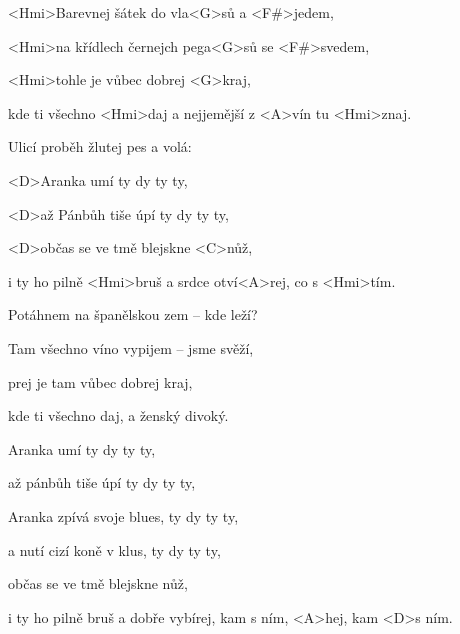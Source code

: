 

\zs
<Hmi>Barevnej šátek do vla<G>sů a <F#>jedem,

<Hmi>na křídlech černejch pega<G>sů se <F#>svedem,

<Hmi>tohle je vůbec dobrej <G>kraj,

kde ti všechno <Hmi>daj a nejjemější z <A>vín tu <Hmi>znaj.
\ks

\zs
Ulicí proběh žlutej pes a volá:

\ks

\zr
<D>Aranka umí  ty dy ty ty,

<D>až Pánbůh tiše úpí  ty dy ty ty,

<D>občas se ve tmě blejskne <C>nůž,

i ty ho pilně <Hmi>bruš a srdce otví<A>rej, co s <Hmi>tím.
\kr

\zs
Potáhnem na španělskou zem -- kde leží?

Tam všechno víno vypijem -- jsme svěží,

prej je tam vůbec dobrej kraj,

kde ti všechno daj, a ženský divoký.
\ks

\zr
Aranka umí  ty dy ty ty,

až pánbůh tiše úpí  ty dy ty ty,

Aranka zpívá svoje blues, ty dy ty ty,

a nutí cizí koně v klus, ty dy ty ty,

občas se ve tmě blejskne nůž,

i ty ho pilně bruš a dobře vybírej, kam s ním, <A>hej, kam <D>s ním.
\kr

\kp





